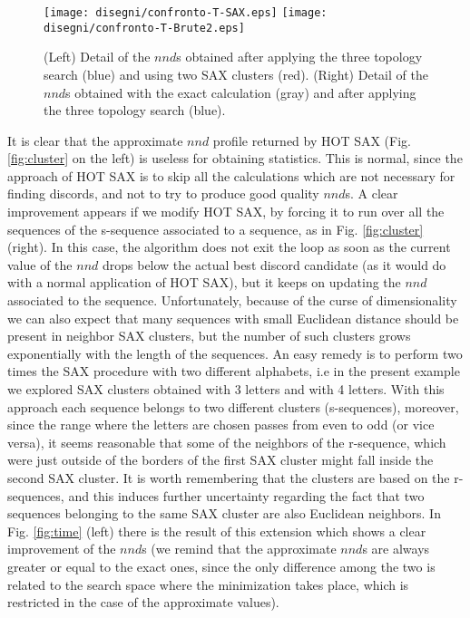 \documentclass[a4paper,twoside]{article}
\begin{document}
\begin{figure*}[!t]
 \texttt{[image: disegni/confronto-T-SAX.eps]} 
 \texttt{[image: disegni/confronto-T-Brute2.eps]}  
 
 \caption{(Left) Detail of the $nnd$s obtained after applying the three topology search (blue) and using two SAX clusters (red).
 (Right) Detail of the $nnd$s obtained with the exact calculation (gray) and after applying the three topology search (blue).}\label{fig:T-vs-B}
%
\end{figure*}


It is clear that the approximate $nnd$ profile returned by HOT SAX (Fig. \ref{fig:cluster} on the left) is useless for obtaining statistics. This is normal, since the approach of HOT SAX is to skip all the calculations which are not necessary for finding discords, and not to try to produce good quality $nnd$s.
%
A clear improvement appears if we modify HOT SAX, by forcing it to run over all the sequences of the s-sequence associated to a sequence, as in Fig. \ref{fig:cluster} (right). In this case, the algorithm does not exit the loop as soon as the current value of the $nnd$ drops below the actual best discord candidate (as it would do with a normal application of HOT SAX), but it keeps on updating the $nnd$ associated to the sequence.
Unfortunately, because of the curse of dimensionality we can also expect that many sequences with small Euclidean distance should be present in neighbor SAX clusters, but the number of such clusters grows exponentially with the length of the sequences. An easy remedy is to perform two times the SAX procedure with two different alphabets, i.e in the present example we explored SAX clusters obtained with 3 letters and with 4 letters. With this approach each sequence belongs to two different clusters (s-sequences), moreover, since the range where the letters are chosen passes from even to odd (or vice versa), it seems reasonable that some of the neighbors of the r-sequence, which were just outside of the borders of the first SAX cluster might fall inside the second SAX cluster. It is worth remembering that the clusters are based on the r-sequences, and this induces further uncertainty regarding the fact that two sequences belonging to the same SAX cluster are also Euclidean neighbors.
%
In Fig. \ref{fig:time} (left) there is the result of this extension which shows a clear improvement of the $nnd$s (we remind that the approximate $nnd$s are always greater or equal to the exact ones, since the only difference among the two is related to the search space where the minimization takes place, which is restricted in the case of the approximate values).
\end{document}
